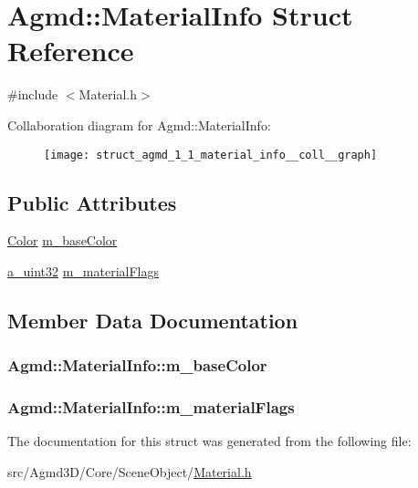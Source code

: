 \hypertarget{struct_agmd_1_1_material_info}{\section{Agmd\+:\+:Material\+Info Struct Reference}
\label{struct_agmd_1_1_material_info}
}


{\ttfamily \#include $<$Material.\+h$>$}



Collaboration diagram for Agmd\+:\+:Material\+Info\+:\nopagebreak
\begin{figure}[H]
\begin{center}
\leavevmode
\texttt{[image: struct\_agmd\_1\_1\_material\_info\_\_coll\_\_graph]}
\end{center}
\end{figure}
\subsection*{Public Attributes}
\begin{DoxyCompactItemize}
\item 
\hyperlink{class_agmd_utilities_1_1_color}{Color} \hyperlink{struct_agmd_1_1_material_info_a9d57d2f23e9a5877ad8830c82fb65d77}{m\+\_\+base\+Color}
\item 
\hyperlink{_common_defines_8h_a964296f9770051b9e4807b1f180dd416}{a\+\_\+uint32} \hyperlink{struct_agmd_1_1_material_info_a4830c033753a2c156cc94fe03d357446}{m\+\_\+material\+Flags}
\end{DoxyCompactItemize}


\subsection{Member Data Documentation}
\hypertarget{struct_agmd_1_1_material_info_a9d57d2f23e9a5877ad8830c82fb65d77}{
\subsubsection[{m\+\_\+base\+Color}]{ Agmd\+::\+Material\+Info\+::m\+\_\+base\+Color}}\label{struct_agmd_1_1_material_info_a9d57d2f23e9a5877ad8830c82fb65d77}
\hypertarget{struct_agmd_1_1_material_info_a4830c033753a2c156cc94fe03d357446}{
\subsubsection[{m\+\_\+material\+Flags}]{ Agmd\+::\+Material\+Info\+::m\+\_\+material\+Flags}}\label{struct_agmd_1_1_material_info_a4830c033753a2c156cc94fe03d357446}


The documentation for this struct was generated from the following file\+:\begin{DoxyCompactItemize}
\item 
src/\+Agmd3\+D/\+Core/\+Scene\+Object/\hyperlink{_material_8h}{Material.\+h}\end{DoxyCompactItemize}
